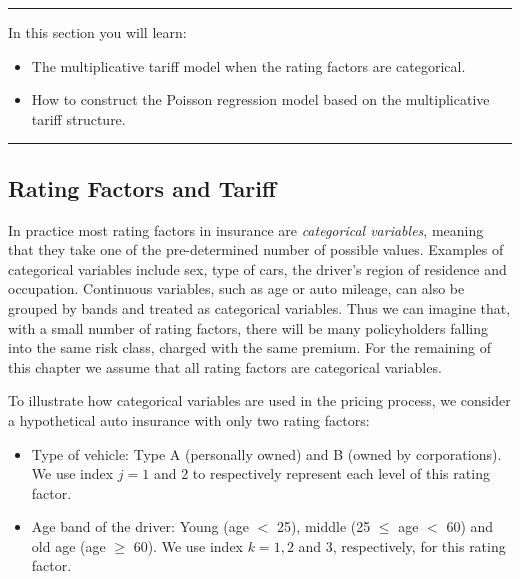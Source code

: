 \documentclass[]{book}
\providecommand{\tightlist}{%
  \setlength{\itemsep}{0pt}\setlength{\parskip}{0pt}}
\theoremstyle{definition}
\theoremstyle{definition}
\theoremstyle{definition}
\theoremstyle{remark}
\begin{document}
\begin{center}\rule{0.5\linewidth}{\linethickness}\end{center}

In this section you will learn:

\begin{itemize}
\tightlist
\item
  The multiplicative tariff model when the rating factors are
  categorical.\\
\item
  How to construct the Poisson regression model based on the
  multiplicative tariff structure.
\end{itemize}

\begin{center}\rule{0.5\linewidth}{\linethickness}\end{center}

\subsection{Rating Factors and Tariff}\label{rating-factors-and-tariff}

In practice most rating factors in insurance are \emph{categorical
variables}, meaning that they take one of the pre-determined number of
possible values. Examples of categorical variables include sex, type of
cars, the driver's region of residence and occupation. Continuous
variables, such as age or auto mileage, can also be grouped by bands and
treated as categorical variables. Thus we can imagine that, with a small
number of rating factors, there will be many policyholders falling into
the same risk class, charged with the same premium. For the remaining of
this chapter we assume that all rating factors are categorical
variables.

To illustrate how categorical variables are used in the pricing process,
we consider a hypothetical auto insurance with only two rating factors:

\begin{itemize}
\tightlist
\item
  Type of vehicle: Type A (personally owned) and B (owned by
  corporations). We use index \(j=1\) and \(2\) to respectively
  represent each level of this rating factor.\\
\item
  Age band of the driver: Young (age \(<\) 25), middle (25 \(\le\) age
  \(<\) 60) and old age (age \(\ge\) 60). We use index \(k=1, 2\) and
  \(3\), respectively, for this rating factor.
\end{itemize}
\end{document}
